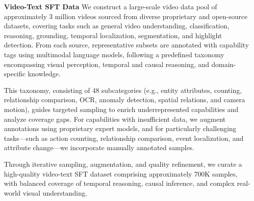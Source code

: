 \documentclass{article}
\begin{document}
\textbf{Video-Text SFT Data}
We construct a large-scale video data pool of approximately 3 million videos sourced from diverse proprietary and open-source datasets, covering tasks such as general video understanding, classification, reasoning, grounding, temporal localization, segmentation, and highlight detection. From each source, representative subsets are annotated with capability tags using multimodal language models, following a predefined taxonomy encompassing visual perception, temporal and causal reasoning, and domain-specific knowledge.

This taxonomy, consisting of 48 subcategories (e.g., entity attributes, counting, relationship comparison, OCR, anomaly detection, spatial relations, and camera motion), guides targeted sampling to enrich underrepresented capabilities and analyze coverage gaps. For capabilities with insufficient data, we augment annotations using proprietary expert models, and for particularly challenging tasks—such as action counting, relationship comparison, event localization, and attribute change—we incorporate manually annotated samples.

Through iterative sampling, augmentation, and quality refinement, we curate a high-quality video-text SFT dataset comprising approximately 700K samples, with balanced coverage of temporal reasoning, causal inference, and complex real-world visual understanding.

\end{document}

